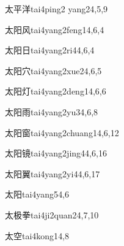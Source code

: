 \begin{verbete}{太平洋}{tai4ping2 yang2}{4,5,9}
\end{verbete}

\begin{verbete}{太阳风}{tai4yang2feng1}{4,6,4}
\end{verbete}

\begin{verbete}{太阳日}{tai4yang2ri4}{4,6,4}
\end{verbete}

\begin{verbete}{太阳穴}{tai4yang2xue2}{4,6,5}
\end{verbete}

\begin{verbete}{太阳灯}{tai4yang2deng1}{4,6,6}
\end{verbete}

\begin{verbete}{太阳雨}{tai4yang2yu3}{4,6,8}
\end{verbete}

\begin{verbete}{太阳窗}{tai4yang2chuang1}{4,6,12}
\end{verbete}

\begin{verbete}{太阳镜}{tai4yang2jing4}{4,6,16}
\end{verbete}

\begin{verbete}{太阳翼}{tai4yang2yi4}{4,6,17}
\end{verbete}

\begin{verbete}{太阳}{tai4yang5}{4,6}
\end{verbete}

\begin{verbete}{太极拳}{tai4ji2quan2}{4,7,10}
\end{verbete}

\begin{verbete}{太空}{tai4kong1}{4,8}
\end{verbete}

